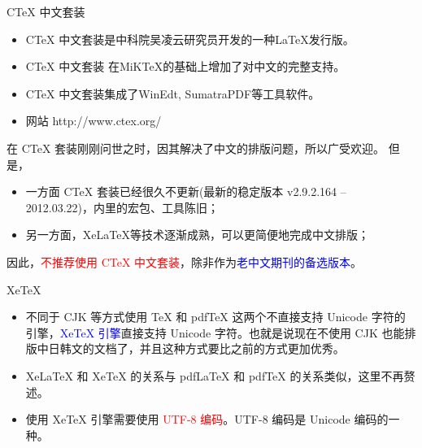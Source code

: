 \documentclass[13pt]{ctexbeamer}
\newcommand{\red}[1]{\textcolor{red}{#1}}
\newcommand{\blue}[1]{\textcolor{blue}{#1}}
\begin{document}
\begin{frame}{CTeX 中文套装}
	
	
	\begin{itemize}
		\item 
		CTeX 中文套装是中科院吴凌云研究员开发的一种LaTeX发行版。
		
		\item 
		CTeX 中文套装 在MiKTeX的基础上增加了对中文的完整支持。
		
		\item CTeX 中文套装集成了WinEdt, SumatraPDF等工具软件。
		\item 
		网站  http://www.ctex.org/
		

	\end{itemize}
	在 CTeX 套装刚刚问世之时，因其解决了中文的排版问题，所以广受欢迎。 但是，
	\begin{itemize}
		\item  一方面 CTeX 套装已经很久不更新(最新的稳定版本	v2.9.2.164 -- 2012.03.22)，内里的宏包、工具陈旧；
		\item 另一方面，XeLaTeX等技术逐渐成熟，可以更简便地完成中文排版；
	\end{itemize}
	
	因此，\red{不推荐使用 CTeX 中文套装}，除非作为\blue{老中文期刊的备选版本}。
	
\end{frame}


\begin{frame}{XeTeX}
	
	\begin{itemize}
		\item 不同于 CJK 等方式使用 TeX 和 pdfTeX 这两个不直接支持 Unicode 字符的引擎，\blue{XeTeX 引擎}直接支持 Unicode 字符。也就是说现在不使用 CJK 也能排版中日韩文的文档了，并且这种方式要比之前的方式更加优秀。
		
		\item XeLaTeX 和 XeTeX 的关系与 pdfLaTeX 和 pdfTeX 的关系类似，这里不再赘述。
		
		\item  使用 XeTeX 引擎需要使用 \red{UTF-8 编码}。{UTF-8 编码}是 Unicode 编码的一种。
	\end{itemize}
\end{frame}
\end{document}
